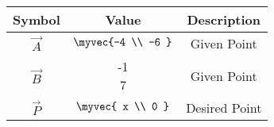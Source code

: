 \begin{tabular}{|c|c|c|}
     \hline
     \textbf{Symbol}& \textbf{Value} & \textbf{Description} \\
     \hline
     $\vec{A}$ & $\myvec{-4 \\ -6 }$ & Given Point \\ 
     \hline
     $\vec{B}$  & \myvec{-1 \\ 7 } & Given Point \\ 
     \hline
     $\vec{P}$ & $\myvec{ x \\ 0 }$ & Desired Point \\ 
     \hline
\end{tabular}
